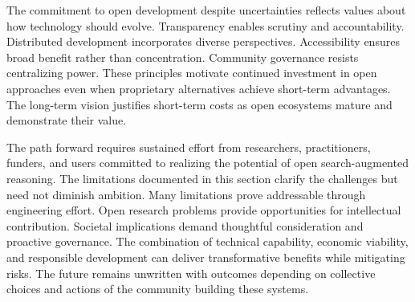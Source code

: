 The commitment to open development despite uncertainties reflects values about how technology should evolve. Transparency enables scrutiny and accountability. Distributed development incorporates diverse perspectives. Accessibility ensures broad benefit rather than concentration. Community governance resists centralizing power. These principles motivate continued investment in open approaches even when proprietary alternatives achieve short-term advantages. The long-term vision justifies short-term costs as open ecosystems mature and demonstrate their value.

The path forward requires sustained effort from researchers, practitioners, funders, and users committed to realizing the potential of open search-augmented reasoning. The limitations documented in this section clarify the challenges but need not diminish ambition. Many limitations prove addressable through engineering effort. Open research problems provide opportunities for intellectual contribution. Societal implications demand thoughtful consideration and proactive governance. The combination of technical capability, economic viability, and responsible development can deliver transformative benefits while mitigating risks. The future remains unwritten with outcomes depending on collective choices and actions of the community building these systems.
